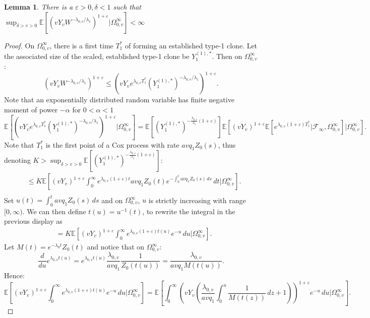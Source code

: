 \documentclass{article}
\numberwithin{equation}{section}
\newtheorem{lemma}{Lemma}
\begin{document}
\begin{lemma}
  There is a $\varepsilon>0,\delta<1$ such that $\sup_{\delta>v>0}\mathbb{E}\left[\left(vY_vW^{-\lambda_{0,v}/\lambda_1}\right)^{1+\varepsilon}|\Omega_{0,v}^\infty\right]<\infty$\label{lem:uniform_integrability}
\end{lemma}
\begin{proof}
  On $\Omega_{0,v}^\infty$, there is a first time $T_1^*$ of forming an established type-1 clone. Let the associated size of the scaled, established type-1 clone be $Y_1^{(1),*}$. Then on $\Omega_{0,v}^\infty$:
  \[\left(vY_vW^{-\lambda_{0,v}/\lambda_1}\right)^{1+\varepsilon}\leq \left(vY_ve^{\lambda_{0,v} T_1^*}(Y_1^{(1),*})^{-\lambda_{0,v}/\lambda_1}\right)^{1+\varepsilon}.\]
  Note that an exponentially distributed random variable has finite negative moment of power $-\alpha$ for $0<\alpha<1$
  \[
  \mathbb{E}\left[\left(vY_ve^{\lambda_{0,v} T_1^*}(Y_1^{(1),*})^{-\lambda_{0,v}/\lambda_1}\right)^{1+\varepsilon}|\Omega_{0,v}^\infty\right]=\mathbb{E}\left[\left(Y_1^{(1),*}\right)^{-\frac{\lambda_{0,v}}{\lambda_1}(1+\varepsilon)}\right]\mathbb{E}\left[(vY_v)^{1+\varepsilon}\mathbb{E}\left[e^{\lambda_{0,v}(1+\varepsilon)T_1^*}|\mathcal{F}_\infty,\Omega_{0,v}^\infty\right]|\Omega_{0,v}^\infty\right].
  \]
  Note that $T_1^*$ is the first point of a Cox process with rate $avq_1Z_0(s)$, thus denoting $K>\sup_{\delta>v>0}\mathbb{E}\left[\left(Y_1^{(1),*}\right)^{-\frac{\lambda_{0,v}}{\lambda_1}(1+\varepsilon)}\right]$:
\begin{align*}
  &\leq K\mathbb{E}\left[(vY_v)^{1+\varepsilon}\int_0^\infty e^{\lambda_{0,v}(1+\varepsilon)t}avq_1 Z_0(t)e^{-\int_0^t avq_1 Z_0(s)\,ds}\,dt|\Omega_{0,v}^\infty\right].\\
\end{align*}
Set $u(t)=\int_0^t avq_1 Z_0(s)\,ds$ and on $\Omega_{0,v}^\infty$, $u$ is strictly increasing with range $[0,\infty)$. We can then define $t(u)=u^{-1}(t)$, to rewrite the integral in the previous display as
\begin{align*}
  &=K\mathbb{E}\left[(vY_v)^{1+\varepsilon}\int_0^\infty e^{\lambda_{0,v}(1+\varepsilon)t(u)}e^{-u}\,du|\Omega_{0,v}^\infty\right].
\end{align*}
Let $M(t)=e^{-\lambda_0 t}Z_0(t)$ and notice that on $\Omega_{0,v}^\infty$:
\[
\frac{d}{du}e^{\lambda_{0,v}t(u)}=e^{\lambda_{0,v}t(u)}\frac{\lambda_{0,v}}{avq_1}\frac{1}{Z_0(t(u))}=\frac{\lambda_{0,v}}{avq_1 M(t(u))}.
\]
Hence:
\[\mathbb{E}\left[(vY_v)^{1+\varepsilon}\int_0^\infty e^{\lambda_{0,v}(1+\varepsilon)t(u)}e^{-u}\,du|\Omega_{0,v}^\infty\right]=\mathbb{E}\left[\int_0^\infty \left(vY_v\left(\frac{\lambda_{0,v}}{avq_1}\int_0^u \frac{1}{M(t(z))}\,dz+1\right)\right)^{1+\varepsilon}e^{-u}\,du|\Omega_{0,v}^\infty\right].\]

\end{proof}
\end{document}
